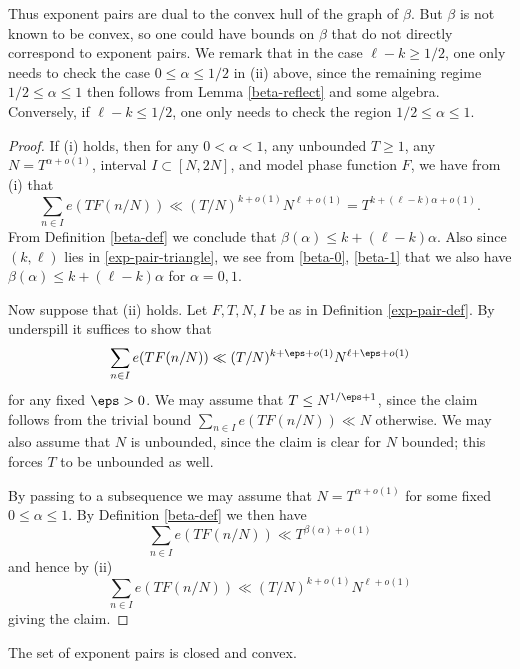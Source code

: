
Thus exponent pairs are dual to the convex hull of the graph of $\beta$.  But $\beta$ is not known to be convex, so one could have bounds on $\beta$ that do not directly correspond to exponent pairs.  We remark that in the case $\ell - k \geq 1/2$, one only needs to check the case $0 \leq \alpha \leq 1/2$ in (ii) above, since the remaining regime $1/2 \leq \alpha \leq 1$ then follows from Lemma \ref{beta-reflect} and some algebra.  Conversely, if $\ell - k \leq 1/2$, one only needs to check the region $1/2 \leq \alpha \leq 1$.

\begin{proof}  If (i) holds, then for any $0 < \alpha < 1$, any unbounded $T \geq 1$, any $N = T^{\alpha+o(1)}$, interval $I \subset [N,2N]$, and model phase function $F$, we have from (i) that
$$ \sum_{n \in I} e(T F(n/N)) \ll (T/N)^{k+o(1)} N^{\ell+o(1)} = T^{k + (\ell-k)\alpha + o(1)}.$$
From Definition \ref{beta-def} we conclude that $\beta(\alpha) \leq k + (\ell-k) \alpha$.  Also since $(k,\ell)$ lies in \eqref{exp-pair-triangle}, we see from \eqref{beta-0}, \eqref{beta-1} that we also have $\beta(\alpha) \leq k + (\ell-k) \alpha$ for $\alpha=0,1$.

Now suppose that (ii) holds.  Let $F, T, N, I$ be as in Definition \ref{exp-pair-def}.  By underspill it suffices to show that
$$ \sum_{n \in I} e(T F(n/N)) \ll (T/N)^{k+\eps+o(1)} N^{\ell+\eps+o(1)}$$
for any fixed $\eps>0$.  We may assume that $T \leq N^{1/\eps+1}$, since the claim follows from the trivial bound $\sum_{n \in I} e(T F(n/N)) \ll N$ otherwise.  We may also assume that $N$ is unbounded, since the claim is clear for $N$ bounded; this forces $T$ to be unbounded as well.

By passing to a subsequence we may assume that $N = T^{\alpha+o(1)}$ for some fixed $0 \leq \alpha \leq 1$.  By Definition \ref{beta-def} we then have
$$ \sum_{n \in I} e(T F(n/N)) \ll T^{\beta(\alpha)+o(1)}$$
and hence by (ii)
$$ \sum_{n \in I} e(T F(n/N)) \ll (T/N)^{k+o(1)} N^{\ell+o(1)}$$
giving the claim.
\end{proof}


\begin{corollary}\label{exp-pair-closed}
\leanok
The set of exponent pairs is closed and convex.
\end{corollary}

